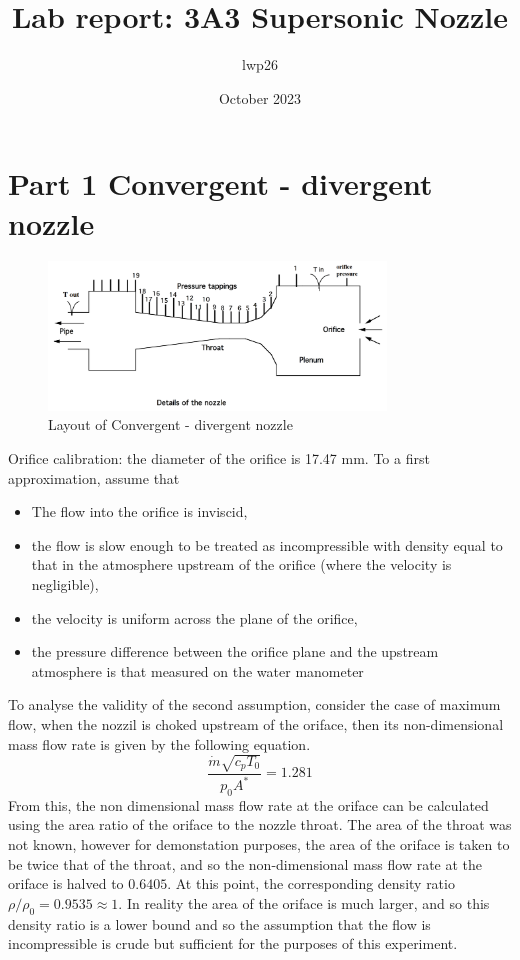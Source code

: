 \documentclass[8pt]{article}
\begin{document}

\title{Lab report: 3A3 Supersonic Nozzle}
\author{lwp26}
\date{October 2023}
\maketitle

\section{Part 1 Convergent - divergent nozzle}

\begin{figure}[H]
    \centering
    \includegraphics[width=0.8\textwidth]{small_nozzle_layout.png}
    \caption{Layout of Convergent - divergent nozzle}
    \label{fig:figure1}
\end{figure}

Orifice calibration: the diameter of the orifice is 17.47 mm. To a first approximation, assume that
\begin{itemize}
    \item The flow into the orifice is inviscid,
    \item the flow is slow enough to be treated as incompressible with density equal to that in the atmosphere upstream of the orifice (where the velocity is negligible),
    \item the velocity is uniform across the plane of the orifice,
    \item the pressure difference between the orifice plane and the upstream atmosphere is that measured on the
    water manometer
\end{itemize} 

To analyse the validity of the second assumption, consider the case of maximum flow, when the nozzil is choked upstream of the oriface, then its non-dimensional mass flow rate is given by the following equation.
\begin{equation}
    \frac{\dot{m}\sqrt{c_pT_0}}{p_0A^*} = 1.281
\end{equation}
From this, the non dimensional mass flow rate at the oriface can be calculated using the area ratio of the oriface to the nozzle throat.
The area of the throat was not known, however for demonstation purposes, the area of the oriface is taken to be twice that of the throat, and so the non-dimensional mass flow rate at the oriface is halved to $0.6405$.
At this point, the corresponding density ratio $\rho/\rho_0 = 0.9535 \approx 1$.
In reality the area of the oriface is much larger, and so this density ratio is a lower bound and so the assumption that the flow is incompressible is crude but sufficient for the purposes of this experiment.
\end{document}

